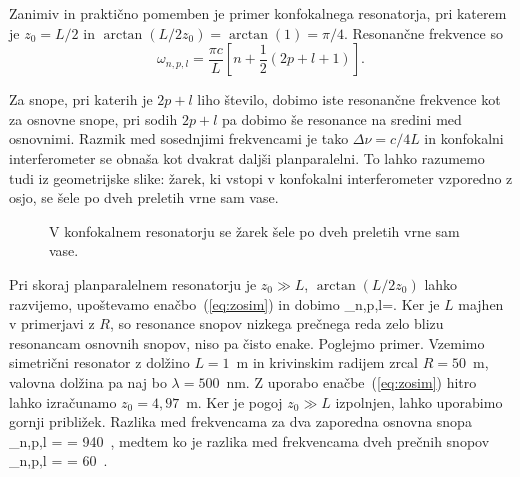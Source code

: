 Zanimiv in praktično pomemben je primer konfokalnega resonatorja,
pri katerem je $z_{0}=L/2$ in $\arctan(L/2z_{0})= \arctan(1)=\pi/4$. Resonančne frekvence
so 
\begin{equation}
\omega_{n,p,l}=\frac{\pi c}{L}\left[n+\frac{1}{2}(2p+l+1)\right].
\label{eq:omega_konf}
\end{equation}

Za snope, pri katerih je $2p+l$ liho število, dobimo iste resonančne frekvence kot
za osnovne snope, pri sodih $2p+l$ pa dobimo še resonance na sredini
med osnovnimi. Razmik med sosednjimi frekvencami je tako $\Delta\nu=c/4L$
in konfokalni interferometer se obnaša kot dvakrat daljši planparalelni.
To lahko razumemo tudi iz geometrijske slike: žarek, ki vstopi v konfokalni
interferometer vzporedno z osjo, se šele po dveh preletih vrne sam
vase.

\begin{figure}[h]
\centering
\def\svgwidth{60truemm} 

\caption{V konfokalnem resonatorju se žarek šele po dveh preletih
vrne sam vase.}
\label{fig:Konfokalni_zarek}
\end{figure}

Pri skoraj planparalelnem 
resonatorju je $z_{0}\gg L$, $\arctan(L/2z_{0})$ lahko razvijemo, upoštevamo enačbo~(\ref{eq:zosim}) in dobimo
\beq
\omega_{n,p,l}=.
\eeq
Ker je $L$ majhen v primerjavi z $R$, so resonance snopov nizkega prečnega reda 
zelo blizu resonancam osnovnih snopov, niso pa čisto enake. Poglejmo primer. Vzemimo 
simetrični resonator z dolžino $L=1$~m in krivinskim radijem zrcal $R=50$~m, 
valovna dolžina pa naj bo $\lambda= 500$~nm. Z uporabo enačbe~(\ref{eq:zosim})
hitro lahko izračunamo $z_0 = 4,97$~m. Ker je pogoj $z_0\gg L$ izpolnjen, lahko uporabimo
gornji približek. Razlika med frekvencama za dva zaporedna osnovna snopa 
\beq
\Delta \omega_{n,p,l} =  = 940~,
\eeq
medtem ko je razlika med frekvencama dveh prečnih snopov
\beq
\Delta \omega_{n,p,l} =   = 60~.
\eeq

